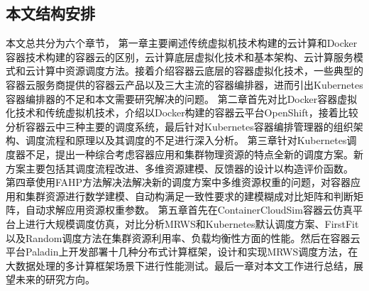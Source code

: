 \subsection{本文结构安排}
本文总共分为六个章节，
第一章主要阐述传统虚拟机技术构建的云计算和Docker容器技术构建的容器云的区别，云计算底层虚拟化技术和基本架构、云计算服务模式和云计算中资源调度方法。接着介绍容器云底层的容器虚拟化技术，一些典型的容器云服务商提供的容器云产品以及三大主流的容器编排器，进而引出Kubernetes容器编排器的不足和本文需要研究解决的问题。
第二章首先对比Docker容器虚拟化技术和传统虚拟机技术，介绍以Docker构建的容器云平台OpenShift，接着比较分析容器云中三种主要的调度系统，最后针对Kubernetes容器编排管理器的组织架构、调度流程和原理以及其调度的不足进行深入分析。
第三章针对Kubernetes调度器不足，提出一种综合考虑容器应用和集群物理资源的特点全新的调度方案。新方案主要包括其调度流程改进、多维资源建模、反馈器的设计以构造评价函数。
第四章使用FAHP方法解决法解决新的调度方案中多维资源权重的问题，对容器应用和集群资源进行数学建模、自动构满足一致性要求的建模糊成对比矩阵和判断矩阵，自动求解应用资源权重参数。
第五章首先在ContainerCloudSim容器云仿真平台上进行大规模调度仿真，对比分析MRWS和Kubernetes默认调度方案、FirstFit以及Random调度方法在集群资源利用率、负载均衡性方面的性能。然后在容器云平台Paladin上开发部署十几种分布式计算框架，设计和实现MRWS调度方法，在大数据处理的多计算框架场景下进行性能测试。最后一章对本文工作进行总结，展望未来的研究方向。


